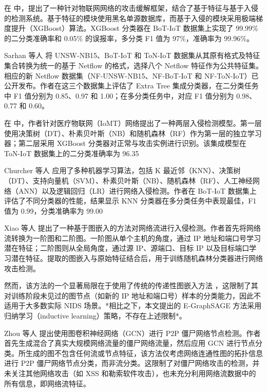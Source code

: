 \documentclass{article}
\begin{document}
在\cite{Mu2020} 中，提出了一种针对物联网网络的攻击缓解框架，结合了基于特征与基于入侵的检测系统。基于特征的模块使用黑名单源数据库，而基于入侵的模块采用极端梯度提升（XGBoost）算法。XGBoost 分类器在 BoT-IoT 数据集上实现了 99.99\% 的二分类准确率和 0.05\% 的误报率，多分类 F1 值为 97\%，准确率为 99.96\%。

Sarhan\cite{Sarhan2021} 等人 将 UNSW-NB15、BoT-IoT 和 ToN-IoT 数据集从其原有格式及特征集合转换为统一的基于 Netflow 的格式，选择八个 Netflow 特征作为公共特征集。相应的新 Netflow 数据集（NF-UNSW-NB15、NF-BoT-IoT 和 NF-ToN-IoT）已公开发布。作者在这三个数据集上评估了 Extra Tree 集成分类器，在二分类任务中 F1 值分别为 0.85、0.97 和 1.00；在多分类任务中，对应 F1 值分别为 0.98、0.77 和 0.60。

在\cite{Kumar2020} 中，作者针对医疗物联网（IoMT）网络提出了一种两层入侵检测模型。第一层使用决策树（DT）、朴素贝叶斯（NB）和随机森林（RF）作为第一层的独立学习器；第二层采用 XGBoost 分类器对正常与攻击实例进行识别。该集成模型在 ToN-IoT 数据集上的二分类准确率为 96.35%

Churcher 等人 \cite{s21020446} 应用了多种机器学习算法，包括 K 最近邻（KNN）、决策树（DT）、支持向量机（SVM）、朴素贝叶斯（NB）、随机森林（RF）、人工神经网络（ANN）以及逻辑回归（LR）进行网络入侵检测。作者在 BoT-IoT 数据集上评估了不同分类器的性能，结果显示 KNN 分类器在多分类任务中表现最佳，F1 值为 0.99，分类准确率为 99.00%

Xiao 等人 \cite{Xiao2020}  提出了一种基于图嵌入的方法对网络流进行入侵检测。作者首先将网络流转换为一阶图和二阶图。一阶图从单个主机的角度，通过 IP 地址和端口号学习潜在特征；二阶图则从全局角度，通过源 IP、源端口、目标 IP 以及目标端口学习潜在特征。提取的图嵌入与原始特征结合后，用于训练随机森林分类器进行网络攻击检测。

然而，该方法的一个显著局限在于使用了传统的传递性图嵌入方法 \cite{hamilton2018inductiverepresentationlearninglarge}，这限制了其对训练阶段未见过的图节点（如新的 IP 地址和端口号）样本的分类能力，因此不适用于大多数实际 NIDS 场景。*相比之下，本文提出的 E-GraphSAGE 方法采用归纳学习（inductive learning）策略，不存在上述限制*。

Zhou 等人 \cite{zhou2020automatingbotnetdetectiongraph}  提出使用图卷积神经网络（GCN）进行 P2P 僵尸网络节点检测。作者首先生成混合了真实大规模网络流量的僵尸网络流量，然后应用 GCN 进行节点分类。所生成的图不包含任何流或节点特征，该方法仅考虑网络连通性图的拓扑信息进行 P2P 僵尸网络节点分类，而非流分类。这限制了对僵尸网络攻击的检测，并未关注其他网络攻击（如 XSS 和勒索软件攻击），也未充分利用网络流数据中的所有信息，即网络流特征。
\end{document}
